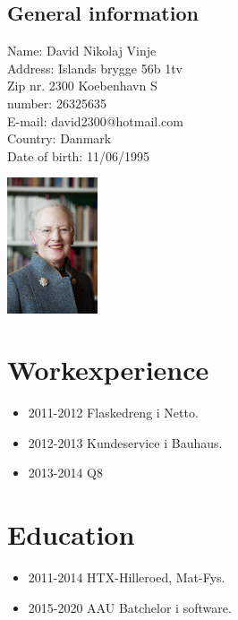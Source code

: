 \begin{center}
 \begin{minipage}[b]{0.45\textwidth} 
\subsection*{General information}
Name: David Nikolaj Vinje \\
Address: Islands brygge 56b 1tv \\
Zip nr. 2300 Koebenhavn S \\
number: 26325635 \\
E-mail: david2300@hotmail.com \\
Country: Danmark \\
Date of birth: 11/06/1995 
 \end{minipage}
 \hfill
\begin{minipage}[b]{3cm}
 \includegraphics[height=4cm]{figures/1200px-Drottning_Margrethe_av_Danmark}
 \end{minipage}
 \end{center}

\section*{Workexperience}
\begin{itemize}
\item 2011-2012 Flaskedreng i Netto.
\item 2012-2013 Kundeservice i Bauhaus.
\item 2013-2014 Q8
\end{itemize}
\section*{Education}
\begin{itemize}
\item 2011-2014 HTX-Hilleroed, Mat-Fys.
\item 2015-2020 AAU Batchelor i software.
\end{itemize}

